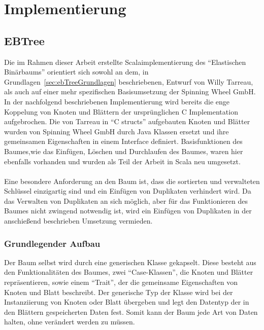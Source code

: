 \documentclass[a4paper,11pt,oneside,%
headsepline,												%
footsepline,												%
bibtotocnumbered									%
]{scrreprt}
\begin{document}
\chapter{Implementierung}

\section{EBTree} %
\label{sec:EbTreeImpl}
Die im Rahmen dieser Arbeit erstellte Scalaimplementierung des \enquote{Elastischen Binärbaums} orientiert sich sowohl an dem, in Grundlagen~\ref{sec:ebTreeGrundlagen} beschriebenen, Entwurf von Willy Tarreau\autocite{Tarreau}, als auch auf einer mehr spezifischen Basisumsetzung der Spinning Wheel GmbH.\\
In der nachfolgend beschriebenen Implementierung  wird bereits die enge Koppelung von Knoten und Blättern der ursprünglichen C Implementation aufgebrochen. Die von Tarreau in \enquote{C structs} aufgebauten Knoten und Blätter wurden von Spinning Wheel GmbH durch Java Klassen ersetzt und ihre gemeinsamen Eigenschaften in einem Interface definiert. Basisfunktionen des Baumes,wie das Einfügen, Löschen und Durchlaufen des Baumes, waren hier ebenfalls vorhanden und wurden als Teil der Arbeit in Scala neu umgesetzt.\\\\
Eine besondere Anforderung an den Baum ist, dass die sortierten und verwalteten Schlüssel einzigartig sind und ein Einfügen von Duplikaten verhindert wird. Da das Verwalten von Duplikaten an sich möglich, aber für das Funktionieren des Baumes nicht zwingend notwendig ist, wird ein Einfügen von Duplikaten in der anschießend beschrieben Umsetzung vermieden. \\
\subsection{Grundlegender Aufbau}
Der Baum selbst wird durch eine generischen Klasse gekapselt. Diese besteht aus den Funktionalitäten des Baumes, zwei \enquote{Case-Klassen}, die Knoten und Blätter repräsentieren, sowie einem \enquote{Trait}, der die gemeinsame Eigenschaften von Knoten und Blatt beschreibt. Der generische Typ der Klasse wird bei der Instanziierung von Knoten oder Blatt übergeben und legt den Datentyp der in den Blättern gespeicherten Daten fest. Somit kann der Baum jede Art von Daten halten, ohne verändert werden zu müssen.\\
\end{document}
